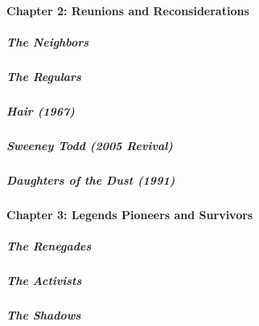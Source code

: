 \hypertarget{chapter-2-reunions-and-reconsiderations}{%
\paragraph{Chapter 2: Reunions and
Reconsiderations}\label{chapter-2-reunions-and-reconsiderations}}

\href{/interactive/2020/04/13/t-magazine/ninth-street-greenwich-village-neighbors.html}{}

\hypertarget{the-neighbors}{%
\subparagraph{The Neighbors}\label{the-neighbors}}

\href{/interactive/2020/04/13/t-magazine/omen-restaurant-nyc.html}{}

\hypertarget{the-regulars}{%
\subparagraph{The Regulars}\label{the-regulars}}

\href{/interactive/2020/04/13/t-magazine/hair-musical-broadway.html}{}

\hypertarget{hair-1967}{%
\subparagraph{Hair (1967)}\label{hair-1967}}

\href{/interactive/2020/04/13/t-magazine/sweeney-todd-revival.html}{}

\hypertarget{sweeney-todd-2005-revival}{%
\subparagraph{Sweeney Todd (2005
Revival)}\label{sweeney-todd-2005-revival}}

\href{/interactive/2020/04/13/t-magazine/daughters-of-the-dust.html}{}

\hypertarget{daughters-of-the-dust-1991}{%
\subparagraph{Daughters of the Dust
(1991)}\label{daughters-of-the-dust-1991}}

\hypertarget{chapter-3-legends-pioneers-and-survivors-1}{%
\paragraph{Chapter 3: Legends Pioneers and
Survivors}\label{chapter-3-legends-pioneers-and-survivors-1}}

\href{/interactive/2020/04/13/t-magazine/butch-stud-lesbian.html}{}

\hypertarget{the-renegades-1}{%
\subparagraph{The Renegades}\label{the-renegades-1}}

\href{/interactive/2020/04/13/t-magazine/act-up-aids.html}{}

\hypertarget{the-activists}{%
\subparagraph{The Activists}\label{the-activists}}

\href{/interactive/2020/04/13/t-magazine/artist-recluse.html}{}

\hypertarget{the-shadows}{%
\subparagraph{The Shadows}\label{the-shadows}}

